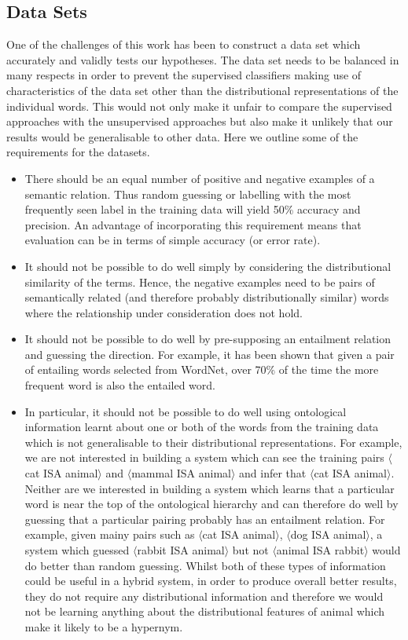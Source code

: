 \documentclass[11pt]{article}
\newcommand\pair[2]{$\langle$#1 ISA #2$\rangle$}
\begin{document}
\subsection{Data Sets}

One of the challenges of this work has been to construct a data set which accurately and validly tests our hypotheses.  The data set needs to be balanced in many respects in order to prevent the supervised classifiers making use of characteristics of the data set other than the distributional representations of the individual words.  This would not only make it unfair to compare the supervised approaches with the unsupervised approaches but also make it unlikely that our results would be generalisable to other data.  Here we outline some of the requirements for the datasets.

\begin{itemize}
\item There should be an equal number of positive and negative examples of a semantic relation.  Thus random guessing or labelling with the most frequently seen label in the training data will yield 50\% accuracy and precision.  An advantage of incorporating this requirement means that evaluation can be in terms of simple accuracy (or error rate).
\item It should not be possible to do well simply by considering the distributional similarity of the terms.  Hence, the negative examples need to be pairs of semantically related (and therefore probably distributionally similar) words where the relationship under consideration does not hold.
\item It should not be possible to do well by pre-supposing an entailment relation and guessing the direction.  For example, it has been shown that given a pair of entailing words selected from WordNet, over 70\% of the time the more frequent word is also the entailed word.
\item In particular, it should not be possible to do well using ontological information learnt about one or both of the words from the training data which is not generalisable to their distributional representations.  For example, we are not interested in building a system which can see the training pairs \pair{cat}{animal} and \pair{mammal}{animal} and infer that \pair{cat}{animal}.  Neither are we interested in building a system which learns that a particular word is near the top of the ontological hierarchy and can therefore do well by guessing that a particular pairing probably has an entailment relation.  For example, given mainy pairs such as \pair{cat}{animal}, \pair{dog}{animal}, a system which guessed \pair{rabbit}{animal} but not \pair{animal}{rabbit} would do better than random guessing.  Whilst both of these types of information could be useful in a hybrid system, in order to produce overall better results, they do not require any distributional information and therefore we would not be learning anything about the distributional features of animal which make it likely to be a hypernym.
\end{itemize}
\end{document}
